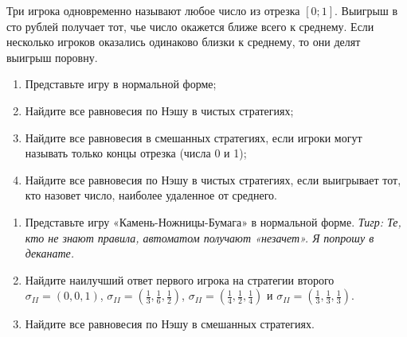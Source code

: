\begin{problem}\par
\begin{source} \cite{cramton:lectures} \end{source}
Три игрока одновременно называют любое число из отрезка  $\left[0;1\right]$. Выигрыш в сто рублей получает тот, чье число окажется ближе всего к среднему. Если несколько игроков оказались одинаково близки к среднему, то они делят выигрыш поровну.\par
\begin{enumerate}
\item 	Представьте игру в нормальной форме;\par
\item 	Найдите все равновесия по Нэшу в чистых стратегиях;\par
\item 	Найдите все равновесия в смешанных стратегиях, если игроки могут называть только концы отрезка (числа 0 и 1);\par
\item	        Найдите все равновесия по Нэшу в чистых стратегиях, если выигрывает тот, кто назовет число, наиболее удаленное от среднего.
\end{enumerate}


\begin{sol}

\end{sol}
\end{problem}



\begin{problem}
\begin{enumerate}
\item 	Представьте игру «Камень-Ножницы-Бумага» в нормальной форме. {\it Тигр: Те, кто не знают правила, автоматом получают «незачет». Я попрошу в деканате.}\par
\item 	Найдите наилучший ответ первого игрока на стратегии второго  $\sigma _{II} =\left(0,0,1\right)$,  $\sigma _{II} =\left(\frac{1}{3},\frac{1}{6},\frac{1}{2} \right)$,  $\sigma _{II} =\left(\frac{1}{4},\frac{1}{2},\frac{1}{4} \right)$  и  $\sigma _{II} =\left(\frac{1}{3},\frac{1}{3},\frac{1}{3} \right)$.\par
\item 	Найдите все равновесия по Нэшу в смешанных стратегиях.
\end{enumerate}

\begin{sol}

\end{sol}
\end{problem}




